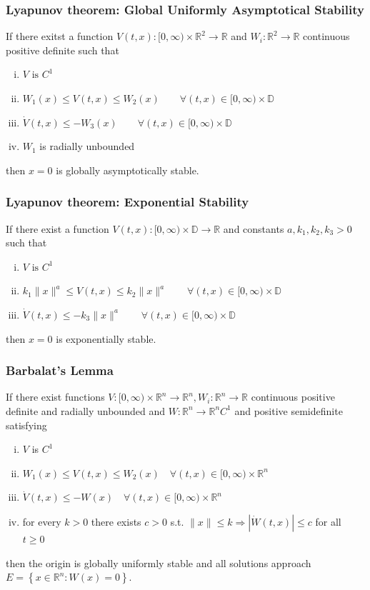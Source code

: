 \documentclass{article}
\newcommand{\mathbbR}{\mathbb{R}}
\begin{document}
\subsubsection{Lyapunov theorem: Global Uniformly Asymptotical Stability}
If there exitst a function $V(t,x):[0, \infty) \times \mathbb{R}^2 \rightarrow
	\mathbbR$ and $W_i: \mathbb{R}^2 \rightarrow \mathbb{R}$ continuous positive
definite such that
\begin{enumerate}[i)]
	\item $V \text{ is } C^1$
	\item $W_1(x) \leq V(t,x) \leq W_2(x) \qquad \forall (t,x) \in [0, \infty) \times \mathbb{D}$
	\item $\dot V(t,x) \leq -W_3(x) \qquad \forall (t,x) \in [0, \infty) \times \mathbb{D}$
	\item $W_1$ is radially unbounded
\end{enumerate}
then $x=0$ is globally asymptotically stable.
\subsubsection{Lyapunov theorem: Exponential Stability}
If there exist a function $V(t,x):[0, \infty) \times \mathbb{D} \rightarrow
	\mathbbR$ and constants $a, k_1, k_2, k_3 > 0$ such that
\begin{enumerate}[i)]
	\item $V \text{ is } C^1$
	\item $k_1 \|x\|^a \leq V(t,x) \leq k_2 \|x\|^a \qquad \forall (t,x) \in [0, \infty) \times \mathbb{D}$
	\item $\dot V(t,x) \leq -k_3 \|x\|^a \qquad \forall (t,x) \in [0, \infty) \times \mathbb{D}$
\end{enumerate}
then $x=0$ is exponentially stable.
\subsubsection{Barbalat's Lemma}
If there exist functions $V:[0, \infty) \times \mathbb{R}^n \rightarrow
	\mathbb{R}^n, W_i: \mathbb{R}^n \rightarrow \mathbb{R}$ continuous positive
definite and radially unbounded and $W: \mathbb{R}^n \rightarrow \mathbb{R}^n
	C^1$ and positive semidefinite satisfying
\begin{enumerate}[i)]
	\item $V$ is $C^1$
	\item $W_1(x) \leq V(t, x) \leq W_2(x) \quad \forall(t, x) \in[0, \infty) \times \mathbb{R}^n$
	\item $\dot{V}(t, x) \leq-W(x) \quad \forall(t, x) \in[0, \infty) \times \mathbb{R}^n$
	\item for every $k>0$ there exists $c>0$ s.t. $\|x\| \leq k
		      \Longrightarrow|\dot{W}(t, x)| \leq c$ for all $t \geq 0$
\end{enumerate}
then the origin is globally uniformly stable and all solutions approach $E=\left\{x \in \mathbb{R}^n: W(x)=0\right\}$.
\end{document}
